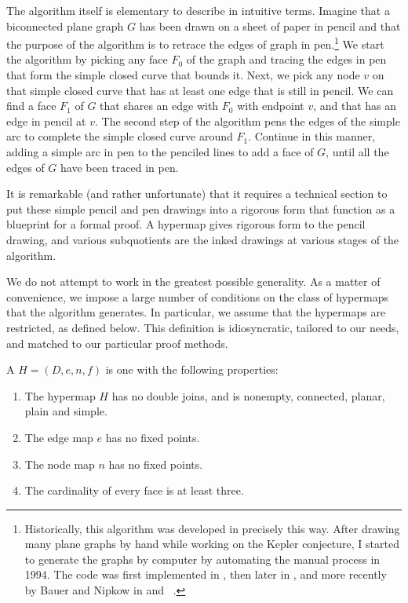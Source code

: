 The algorithm itself is elementary to describe in intuitive terms.
Imagine that a biconnected plane graph $G$ has been drawn on a sheet
of paper in pencil and that the purpose of the algorithm is to retrace
the edges of graph in pen.\footnote{Historically, this algorithm was
  developed in precisely this way.  After drawing many plane graphs by
  hand while working on the Kepler conjecture, I started to generate
  the graphs by computer by automating the manual process in 1994.
  The code was first implemented in , then later
  in , and more recently by Bauer and Nipkow in
   and ~\cite{Nipkow:2005:Tame}.}
We start the algorithm by picking any face $F_0$ of the graph and
tracing the edges in pen that form the simple closed curve that bounds
it.  Next, we pick any node $v$ on that simple closed curve that has
at least one edge that is still in pencil.  We can find a face $F_1$
of $G$ that shares an edge with $F_0$ with endpoint $v$, and that has
an edge in pencil at $v$.  The second step of the algorithm pens the
edges of the simple arc to complete the simple closed curve around
$F_1$.  Continue in this manner, adding a simple arc in pen to the
penciled lines to add a face of $G$, until all the edges of $G$ have
been traced in pen.  %


It is remarkable (and rather unfortunate) that it  requires a
technical section  to put these simple pencil and pen
drawings into a rigorous form that function as a blueprint for a
formal proof.  A hypermap gives rigorous form to the pencil drawing, and various
subquotients are the inked drawings at various stages of the algorithm.


We do not attempt to work in the greatest possible generality.  As a
matter of convenience, we impose a large number of conditions on the
class of hypermaps that the algorithm generates.  In particular, we
assume that the hypermaps are restricted, as defined below.  This
definition is idiosyncratic, tailored to our needs, and matched to our
particular proof methods.


\begin{definition}[restricted]\label{def:restricted}
A  $H = (D,e,n,f)$ is one with the following 
properties:
\begin{enumerate}
\item The hypermap $H$ has no double joins, and is nonempty,
  connected, planar, plain and simple.
\item The edge map $e$ has no fixed points.  %
\item The node map $n$ has no fixed points.
\item The cardinality of every face is at least three.
\end{enumerate}
%
%
\end{definition}

